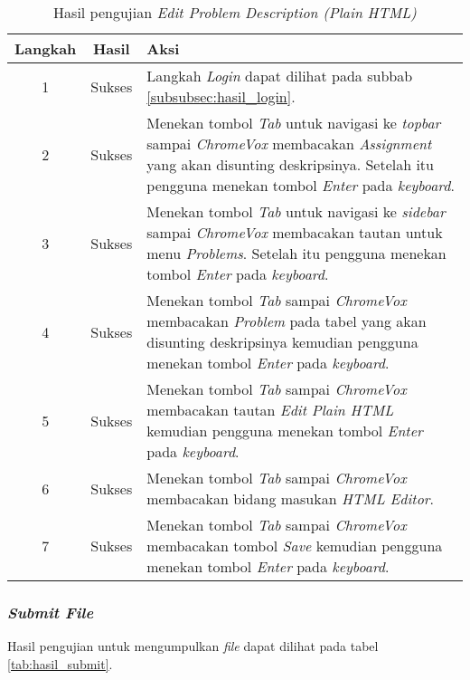 \begin{table}[H]
	\centering
	\caption{Hasil pengujian \textit{Edit Problem Description (Plain HTML)}}
	\label{tab:hasil_edit_problem_description_plain_html}
	\begin{tabular}{|c|c|p{12cm}|}
		\toprule
		Langkah & Hasil & Aksi\\
		\midrule
		1 & Sukses & Langkah \textit{Login} dapat dilihat pada subbab \ref{subsubsec:hasil_login}.\\
		2 & Sukses & Menekan tombol \textit{Tab} untuk navigasi ke \textit{topbar} sampai \textit{ChromeVox} membacakan \textit{Assignment} yang akan disunting deskripsinya. Setelah itu pengguna menekan tombol \textit{Enter} pada \textit{keyboard}.\\
		3 & Sukses & Menekan tombol \textit{Tab} untuk navigasi ke \textit{sidebar} sampai \textit{ChromeVox} membacakan tautan untuk menu \textit{Problems}. Setelah itu pengguna menekan tombol \textit{Enter} pada \textit{keyboard}.\\
		4 & Sukses & Menekan tombol \textit{Tab} sampai \textit{ChromeVox} membacakan \textit{Problem} pada tabel yang akan disunting deskripsinya kemudian pengguna menekan tombol \textit{Enter} pada \textit{keyboard}.\\
		5 & Sukses & Menekan tombol \textit{Tab} sampai \textit{ChromeVox} membacakan tautan \textit{Edit Plain HTML} kemudian pengguna menekan tombol \textit{Enter} pada \textit{keyboard}.\\
		6 & Sukses & Menekan tombol \textit{Tab} sampai \textit{ChromeVox} membacakan bidang masukan \textit{HTML Editor}.\\
		7 & Sukses & Menekan tombol \textit{Tab} sampai \textit{ChromeVox} membacakan tombol \textit{Save} kemudian pengguna menekan tombol \textit{Enter} pada \textit{keyboard}.\\
		\bottomrule
	\end{tabular}
\end{table}

\subsubsection{\textit{Submit File}}
\label{subsubsec:hasil_submit}
Hasil pengujian untuk mengumpulkan \textit{file} dapat dilihat pada tabel \ref{tab:hasil_submit}.

